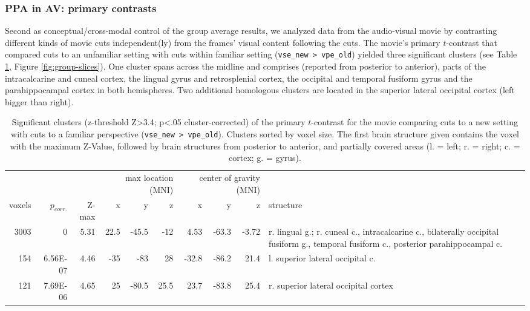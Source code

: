 \documentclass[english]{article}
\begin{document}
\subsubsection{PPA in AV: primary contrasts}
Second as conceptual/cross-modal control of the group average results, we
analyzed data from the audio-visual movie by contrasting different kinds of
movie cuts independent(ly) from the frames' visual content following the cuts.
The movie's primary $t$-contrast that compared cuts to an unfamiliar setting
with cuts within familiar setting (\texttt{vse\_new > vpe\_old}) yielded three
significant clusters (see Table \ref{tab:res-av-group1}, Figure
\ref{fig:group-slices}).
One cluster spans across the midline and comprises (reported from posterior to
anterior), parts of the intracalcarine and cuneal cortex, the lingual gyrus and
retrosplenial cortex, the occipital and temporal fusiform gyrus and the
parahippocampal cortex in both hemispheres.
Two additional homologous clusters are located in the superior lateral occipital
cortex (left bigger than right).


\begin{table}[t]
    \caption{Significant clusters (z-threshold Z>3.4; p<.05 cluster-corrected)
        of the primary $t$-contrast for the movie comparing cuts to a new
        setting with cuts to a familiar perspective (\texttt{vse\_new >
        vpe\_old}).
Clusters sorted by voxel size.
The first brain structure given contains the voxel with the maximum Z-Value,
followed by brain structures from posterior to anterior, and partially covered
areas (l. = left; r. = right; c. = cortex; g. = gyrus).}
\label{tab:res-av-group1}
\begin{tabular}{rrrrrrrrrp{3cm}}
\toprule
& & & \multicolumn{3}{r}{max location (MNI)} & \multicolumn{3}{r}{center of gravity (MNI)} &
\\ \cmidrule{4-6} \cmidrule{7-9}
voxels & $p_{corr.}$ & Z-max & x & y & z  & x & y & z & structure \\
\midrule
3003 & 0 & 5.31 & 22.5 & -45.5 & -12 & 4.53 & -63.3 & -3.72 & r. lingual g.; r. cuneal c., intracalcarine c., bilaterally occipital fusiform g., temporal fusiform c., posterior parahippocampal c.  \\
154 & 6.56E-07 & 4.46 & -35 & -83 & 28 & -32.8 & -86.2 & 21.4 & l. superior lateral occipital c. \\
121 & 7.69E-06 & 4.65 & 25 & -80.5 & 25.5 & 23.7 & -83.8 & 25.4 & r. superior lateral occipital cortex \\
\bottomrule
\end{tabular}
\end{table}
\end{document}
